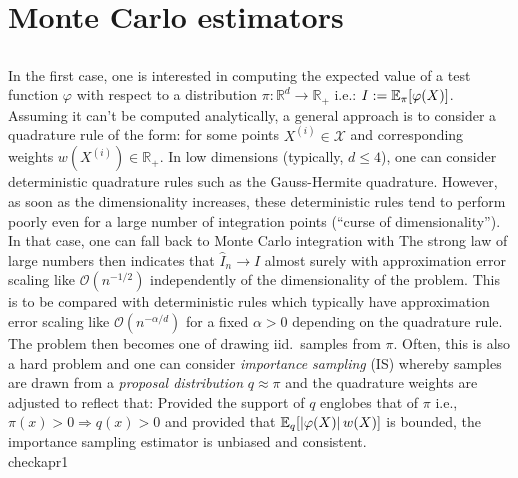 
\section{Monte Carlo estimators}

\subsection{}

In the first case, one is interested in computing the expected value of a test function $\varphi$ with respect to a distribution $\pi:\mathbb R^{d} \to \mathbb R_+$ i.e.: $I:=\mathbb E_\pi[\varphi(X)]$. Assuming it can't be computed analytically, a general approach is to consider a quadrature rule of the form:
%
%
for some points $X^{(i)}\in\mathcal X$ and corresponding weights $w(X^{(i)})\in\mathbb R_+$. In low dimensions (typically, $d\le 4$), one can consider deterministic quadrature rules such as the Gauss-Hermite quadrature. However, as soon as the dimensionality increases, these deterministic rules tend to perform poorly even for a large number of integration points (``curse of dimensionality''). In that case, one can fall back to Monte Carlo integration with
%
%
The strong law of large numbers then indicates that $\widehat I_n\to I$ almost surely with approximation error scaling like $\mathcal O(n^{-1/2})$ independently of the dimensionality of the problem. This is to be compared with deterministic rules which typically have approximation error scaling like $\mathcal O(n^{-\alpha/d})$ for a fixed $\alpha>0$ depending on the quadrature rule.\\

The problem then becomes one of drawing iid.\ samples from $\pi$. Often, this is also a hard problem and one can consider \emph{importance sampling} (IS) whereby samples are drawn from a \emph{proposal distribution} $q\approx \pi$ and the quadrature weights are adjusted to reflect that:
%
%
Provided the support of $q$ englobes that of $\pi$ i.e., $\pi(x)>0\Rightarrow q(x)>0$ and provided that $\mathbb E_q[\left|\varphi(X)\right|w(X)]$ is bounded, the importance sampling estimator is unbiased and consistent.\\check{apr1}


